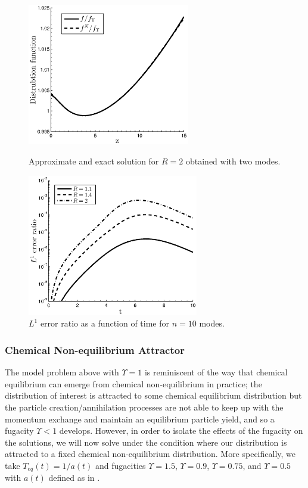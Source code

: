\begin{figure}[H]
 \begin{minipage}[t]{0.5\linewidth}
\centerline{\includegraphics[height=6.2cm]{03-birrell/SpectralMethodBoltzmann/keq_approx_T_r_2.eps}}
\caption{Approximate and exact solution for $R=2$ obtained with two modes.}\label{fig:keq_approx_Tr_2}
 \end{minipage}
 \hspace{0.5cm}
 \begin{minipage}[t]{0.5\linewidth}
\centerline{\includegraphics[height=6.2cm]{03-birrell/SpectralMethodBoltzmann/keq_L1_err_time.eps}}
\caption{$L^1$ error ratio as a function of time for $n=10$ modes.}\label{fig:keq_L1_err_time}
 \end{minipage}
 \end{figure}


\subsubsection{Chemical Non-equilibrium Attractor}
The model problem above with $\Upsilon=1$  is reminiscent of the way that chemical equilibrium can emerge from chemical non-equilibrium in practice; the distribution of interest is attracted to some chemical equilibrium distribution but the particle creation/annihilation processes are not able to keep up with the momentum exchange and maintain an equilibrium particle yield, and so a fugacity $\Upsilon<1$ develops.  However, in order to isolate the effects of the fugacity on the solutions, we will now solve  under the  condition where our distribution is attracted to a fixed chemical non-equilibrium distribution.  More specifically, we take $T_{eq}(t)=1/a(t)$ and fugacities $\Upsilon=1.5$, $\Upsilon=0.9$, $\Upsilon=0.75$, and $\Upsilon=0.5$ with $a(t)$ defined as in .


